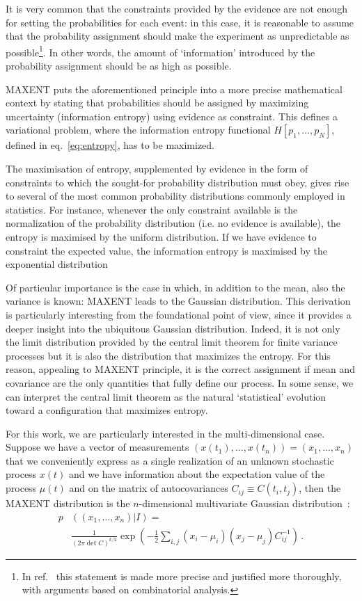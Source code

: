 \documentclass[twocolumn,showpacs,preprintnumbers,nofootinbib,prd,
superscriptaddress,10pt]{revtex4-1}
\begin{document}
It is very common that the constraints provided by the evidence are not enough for setting the probabilities for each event: in this case, it is reasonable to assume that the probability assignment should make the experiment as unpredictable as possible\footnote{
In ref.~\cite{Jaynes_MAXENT} this statement is made more precise and justified more thoroughly, with arguments based on combinatorial analysis.
}.
In other words, the amount of `information' introduced by the probability assignment should be as high as possible.

MAXENT puts the aforementioned principle into a more precise mathematical context by stating that probabilities should be assigned by maximizing uncertainty (information entropy) using evidence as constraint. 
This defines a variational problem, where the information entropy functional $H\left[p_1, \dots, p_N\right]$, defined in eq.~\eqref{eq:entropy}, has to be maximized. 

The maximisation of entropy, supplemented by evidence in the form of constraints to which the sought-for probability distribution must obey,
gives rise to several of the most common probability distributions commonly employed in statistics. For instance, whenever the only constraint available is the normalization of the probability distribution (i.e. no evidence is available), the entropy is maximised by the uniform distribution. 
If we have evidence to constraint the expected value, the information entropy is maximised by the exponential distribution

Of particular importance is the case in which, in addition to the mean, also the variance is known: MAXENT leads to the Gaussian distribution. 
This derivation is particularly interesting from the foundational point of view, since it provides a deeper insight into the ubiquitous Gaussian distribution.
Indeed, it is not only the limit distribution provided by the central limit theorem for finite variance processes but it is also the distribution that maximizes the entropy. For this reason, appealing to MAXENT principle, it is the correct assignment if mean and covariance are the only quantities that fully define our process. In some sense, we can interpret the central limit theorem as the natural `statistical' evolution toward a configuration that maximizes entropy.

For this work, we are particularly interested in the multi-dimensional case. Suppose we have a vector of measurements $(x(t_1),\ldots,x(t_n)) = (x_1, \ldots, x_n)$ that we conveniently express as a single realization of an unknown stochastic process $x(t)$ and we have information about the expectation value of the process $\mu(t)$ and on the matrix of autocovariances $C_{ij} \equiv C(t_i,t_j)$, then the MAXENT distribution is the $n$-dimensional multivariate Gaussian distribution~\cite{gregory_2005}: 
\begin{align}
    p&\left((x_1, \ldots, x_n)\vert I\right) = \nonumber \\
    &\frac{1}{\left(2 \pi \det C\right)^{k / 2}}\exp\left(-\frac{1}{2}\sum_{i,j}(x_i-\mu_i) (x_j-\mu_j)C^{-1}_{ij} \right)\,. 
\end{align}
\end{document}
